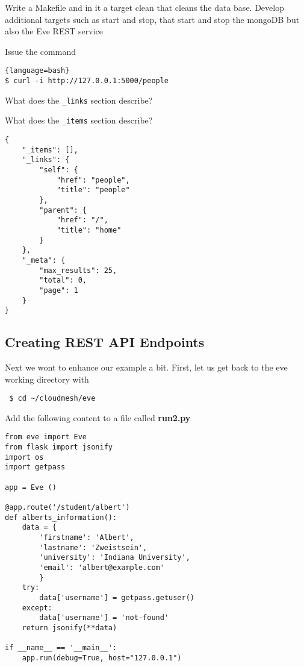 \begin{exercise}
Write a Makefile and in it a target clean that cleans the data
base. Develop additional targets such as start and stop, that start
and stop the mongoDB but also the Eve REST service
\end{exercise}


\begin{exercise}
Issue the command

\begin{lstlisting}{language=bash}
$ curl -i http://127.0.0.1:5000/people
\end{lstlisting}

What does the \verb|_links| section describe?

What does the \verb|_items| section describe?

\begin{lstlisting}
{
    "_items": [],
    "_links": {
        "self": {
            "href": "people",
            "title": "people"
        },
        "parent": {
            "href": "/",
            "title": "home"
        }
    },
    "_meta": {
        "max_results": 25,
        "total": 0,
        "page": 1
    }
}
\end{lstlisting} 
\end{exercise}

\clearpage

\subsection{Creating REST API Endpoints}\label{s:rest-api-endpoints}

Next we wont to enhance our example a bit. First, let us get back to
the eve working directory with

\begin{lstlisting}
 $ cd ~/cloudmesh/eve
\end{lstlisting}

Add the following content to a file called \textbf{run2.py}

\begin{lstlisting}
from eve import Eve
from flask import jsonify
import os
import getpass

app = Eve ()

@app.route('/student/albert')
def alberts_information():
    data = {
        'firstname': 'Albert',
        'lastname': 'Zweistsein',
        'university': 'Indiana University',
        'email': 'albert@example.com'
        }
    try:
        data['username'] = getpass.getuser()
    except:
        data['username'] = 'not-found'
    return jsonify(**data)

if __name__ == '__main__':
    app.run(debug=True, host="127.0.0.1")
\end{lstlisting}


